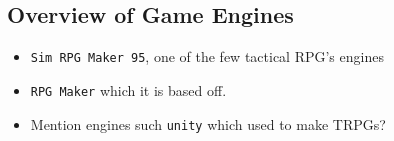 \subsection{Overview of Game Engines}
\label{sub:overview_of_game_engines}

\begin{itemize}
	\item \texttt{Sim RPG Maker 95}, one of the few tactical RPG's engines
	\item \texttt{RPG Maker} which it is based off. 
	\item Mention  engines such \texttt{unity} which used to make TRPGs?  
\end{itemize}

